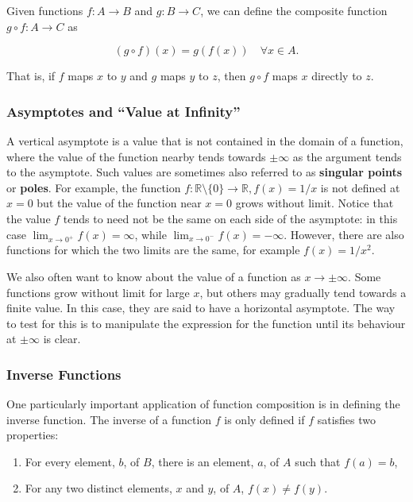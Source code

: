 \documentclass[11pt,titlepage]{article}
\numberwithin{equation}{section}
\begin{document}
Given functions $f:A\to B$ and $g:B\to C$, we can define the composite function $g\circ f:A\to C$ as

\begin{equation}
(g\circ f)(x) = g(f(x)) \quad \forall x \in A.
\end{equation}

That is, if $f$ maps $x$ to $y$ and $g$ maps $y$ to $z$, then $g\circ f$ maps $x$ directly to $z$.

\subsubsection{Asymptotes and “Value at Infinity”}
A vertical asymptote is a value that is not contained in the domain of a function, where the value of the function nearby tends towards $\pm\infty$ as the argument tends to the asymptote. Such values are sometimes also referred to as \textbf{singular points} or \textbf{poles}. For example, the function $f:\mathbb{R}\setminus\{0\}\rightarrow\mathbb{R}, f(x)=1/x$ is not defined at $x=0$ but the value of the function near $x=0$ grows without limit. Notice that the value $f$ tends to need not be the same on each side of the asymptote: in this case $\lim_{x\to 0^{+}} f(x) = \infty$, while $\lim_{x\to 0^{-}} f(x) = -\infty$. However, there are also functions for which the two limits are the same, for example $f(x)=1/x^{2}$.

We also often want to know about the value of a function as $x\rightarrow\pm\infty$. Some functions grow without limit for large $x$, but others may gradually tend towards a finite value. In this case, they are said to have a horizontal asymptote. The way to test for this is to manipulate the expression for the function until its behaviour at $\pm\infty$ is clear. 

\subsubsection{Inverse Functions}

One particularly important application of function composition is in defining the inverse function. The inverse of a function $f$ is only defined if $f$ satisfies two properties:

\begin{enumerate}
    \item For every element, $b$, of $B$, there is an element, $a$, of $A$ such that $f(a) = b$,
    \item For any two distinct elements, $x$ and $y$, of $A$, $f(x) \neq f(y)$.
\end{enumerate}
\end{document}
